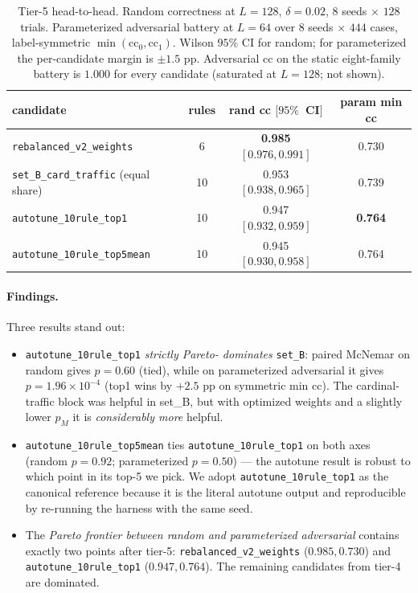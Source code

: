 \documentclass[11pt,a4paper]{article}
\begin{document}
\begin{table}[h]\centering\small
\begin{tabular}{l c c c}
\toprule
candidate & rules & rand cc \([95\%\)~CI\(]\) & param min cc \\
\midrule
\texttt{rebalanced\_v2\_weights}        & 6  & \textbf{0.985} \([0.976, 0.991]\) & 0.730 \\
\texttt{set\_B\_card\_traffic} (equal share) & 10 & 0.953 \([0.938, 0.965]\) & 0.739 \\
\texttt{autotune\_10rule\_top1}         & 10 & 0.947 \([0.932, 0.959]\) & \textbf{0.764} \\
\texttt{autotune\_10rule\_top5mean}     & 10 & 0.945 \([0.930, 0.958]\) & 0.764 \\
\bottomrule
\end{tabular}
\caption{Tier-5 head-to-head.  Random correctness at \(L=128\),
\(\delta=0.02\), \(8\) seeds \(\times\) \(128\) trials.
Parameterized adversarial battery at \(L=64\) over \(8\) seeds
\(\times\) \(444\) cases, label-symmetric
\(\min(\mathrm{cc}_0, \mathrm{cc}_1)\).  Wilson \(95\%\) CI for
random; for parameterized the per-candidate margin is \(\pm 1.5\)
pp.  Adversarial cc on the static eight-family battery is
\(1.000\) for every candidate (saturated at \(L=128\); not shown).}
\label{tab:tier-5}
\end{table}

\paragraph{Findings.}
Three results stand out:
\begin{itemize}
\item \texttt{autotune\_10rule\_top1} \emph{strictly Pareto-
  dominates} \texttt{set\_B}: paired McNemar on random gives
  \(p = 0.60\) (tied), while on parameterized adversarial it gives
  \(p = 1.96 \times 10^{-4}\) (top1 wins by \(+2.5\) pp on
  symmetric min cc).  The cardinal-traffic block was helpful in
  set\_B, but with optimized weights and a slightly lower \(p_M\) it
  is \emph{considerably more} helpful.
\item \texttt{autotune\_10rule\_top5mean} ties
  \texttt{autotune\_10rule\_top1} on both axes
  (random \(p = 0.92\); parameterized \(p = 0.50\)) --- the autotune
  result is robust to which point in its top-5 we pick.  We adopt
  \texttt{autotune\_10rule\_top1} as the canonical reference because
  it is the literal autotune output and reproducible by re-running
  the harness with the same seed.
\item The \emph{Pareto frontier between random and parameterized
  adversarial} contains exactly two points after tier-5:
  \texttt{rebalanced\_v2\_weights} (\(0.985, 0.730\)) and
  \texttt{autotune\_10rule\_top1} (\(0.947, 0.764\)).  The
  remaining candidates from tier-4 are dominated.
\end{itemize}
\end{document}

